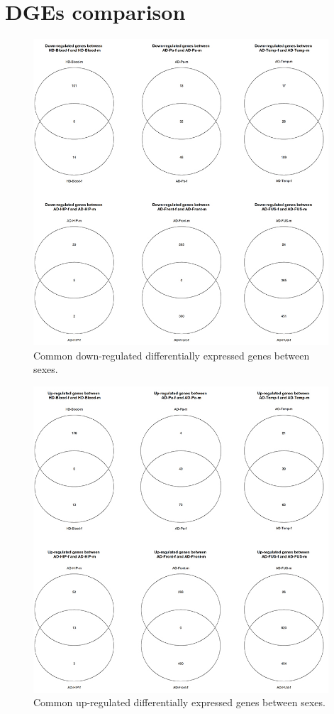\chapter{DGEs comparison} \label{Venn-degs}

\begin{figure}[ht]
    \centerline{\includegraphics[width = 11cm]{Figures/downcommon.jpg}}
\caption{Common down-regulated differentially expressed genes between sexes.}
\end{figure}

\begin{figure}[ht]
    \centerline{\includegraphics[width = 11cm]{Figures/upcommon.jpg}}
\caption{Common up-regulated differentially expressed genes between sexes.}
\end{figure}